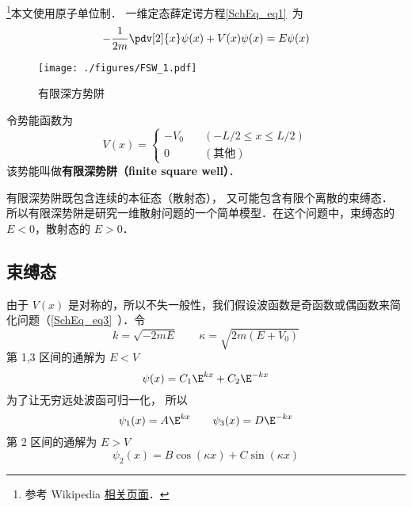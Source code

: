 
\begin{issues}
\issueTODO
\end{issues}





\footnote{参考 Wikipedia \href{https://en.wikipedia.org/wiki/Finite_potential_well}{相关页面}．}本文使用原子单位制． 一维定态薛定谔方程\autoref{SchEq_eq1}~为
\begin{equation}
-\frac{1}{2m}\pdv[2]{x}\psi(x) + V(x) \psi(x) = E \psi(x)
\end{equation}

\begin{figure}[ht]
\centering
\texttt{[image: ./figures/FSW\_1.pdf]}
\caption{有限深方势阱} \label{FSW_fig1}
\end{figure}
令势能函数为
\begin{equation}
V(x) = \begin{cases}
-V_0 \quad &(-L/2 \leqslant x \leqslant L/2)\\
0 \quad &(\text{其他})
\end{cases}
\end{equation}
该势能叫做\textbf{有限深势阱（finite square well）}．

有限深势阱既包含连续的本征态（散射态）， 又可能包含有限个离散的束缚态． %
所以有限深势阱是研究一维散射问题的一个简单模型．在这个问题中，束缚态的 $E<0$，散射态的 $E>0$． 

\subsection{束缚态}
由于 $V(x)$ 是对称的，所以不失一般性，我们假设波函数是奇函数或偶函数来简化问题（\autoref{SchEq_eq3}~）．令
\begin{equation}\label{FSW_eq4}
k = \sqrt{-2mE} \qquad \kappa = \sqrt{2m(E + V_0)}
\end{equation}
第 1,3 区间的通解为 $E < V$
\begin{equation}
\psi(x) = C_1 \E^{kx} + C_2 \E^{-kx}
\end{equation}
为了让无穷远处波函可归一化， 所以
\begin{equation}
\psi_1(x) = A \E^{kx} \qquad \psi_3(x) = D\E^{-kx}
\end{equation}
第 2 区间的通解为 $E > V$
\begin{equation}
\psi_2(x) = B \cos(\kappa x) + C\sin(\kappa x)
\end{equation}

